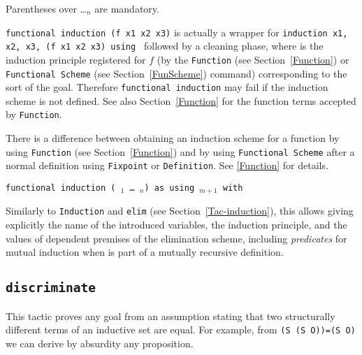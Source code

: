 \begin{coq_example*}
\Rem Parentheses over \qualid \dots \term$_n$ are mandatory.

\Rem \texttt{functional induction (f x1 x2 x3)} is actually a wrapper
for \texttt{induction x1, x2, x3, (f x1 x2 x3) using \qualid} followed by
a cleaning phase, where {\qualid} is the induction principle
registered for $f$ (by the \texttt{Function} (see Section~\ref{Function})
or \texttt{Functional Scheme} (see Section~\ref{FunScheme}) command)
corresponding to the sort of the goal.  Therefore \texttt{functional
  induction} may fail if the induction scheme {\qualid} is
not defined. See also Section~\ref{Function} for the function terms
accepted by \texttt{Function}.

\Rem There is a difference between obtaining an induction scheme for a
function by using \texttt{Function} (see Section~\ref{Function}) and by
using \texttt{Functional Scheme} after a normal definition using
\texttt{Fixpoint} or \texttt{Definition}. See \ref{Function} for
details.

\SeeAlso{\ref{Function},\ref{FunScheme},\ref{FunScheme-examples},
  \ref{sec:functional-inversion}}

\begin{ErrMsgs}
\item {}
\item {}
\end{ErrMsgs}

\begin{Variants}
\item {\tt functional induction (\qualid\ \term$_1$ \dots\ \term$_n$)
  as {\disjconjintropattern} using \term$_{m+1}$ with \bindinglist}

 Similarly to \texttt{Induction} and \texttt{elim}
 (see Section~\ref{Tac-induction}), this allows giving explicitly the
 name of the introduced variables, the
 induction principle, and the values of dependent premises of the
 elimination scheme, including \emph{predicates} for mutual induction
 when {\qualid} is part of a mutually recursive definition.

\end{Variants}

\subsection{\tt discriminate \term}
\label{discriminate}


This tactic proves any goal from an assumption stating that two
structurally different terms of an inductive set are equal. For
example, from {\tt (S (S O))=(S O)} we can derive by absurdity any
proposition.


\end{coq_example*}
